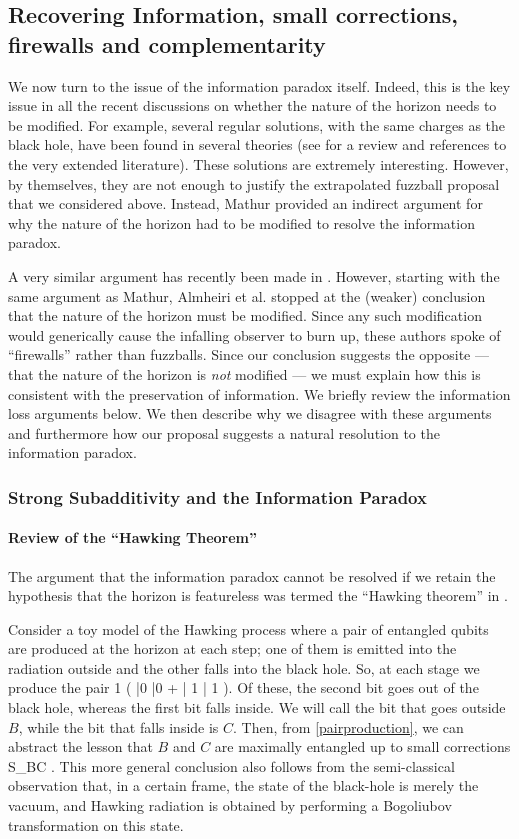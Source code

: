 \subsection{Recovering Information, small corrections, firewalls and complementarity}
We now turn to the issue of the information paradox itself. Indeed, this is the key issue in all the recent discussions on whether the nature of the horizon needs to be modified. For example, several regular solutions, with the same charges as the black hole, have been found in several theories (see \cite{Skenderis:2008qn} for a review and references to the very extended literature). These solutions are extremely interesting. However, by themselves, they are not enough to justify the extrapolated fuzzball proposal that we considered above. Instead, Mathur \cite{Mathur:2009hf} provided an indirect argument for why the nature of the horizon had to be 
modified to resolve the information paradox. 

A very similar argument has recently been made in \cite{Almheiri:2012rt}. However, starting with the same argument as Mathur,  Almheiri et al. stopped at  the (weaker) conclusion that the nature of the horizon must be modified. Since any such modification would generically cause the infalling observer to burn up, these authors spoke of ``firewalls'' rather than fuzzballs. 
 Since our conclusion suggests the opposite --- that the nature of the horizon is {\em not} modified --- we must explain how this is consistent with 
the preservation of information. We briefly review the information loss arguments below. We then describe why we disagree with these arguments and furthermore how our proposal suggests a natural resolution to the information paradox.  
\subsubsection{Strong Subadditivity and the Information Paradox}
\paragraph{Review of the ``Hawking Theorem''}
The argument that the information paradox cannot be resolved if we retain
the hypothesis that the horizon is featureless was termed the ``Hawking theorem'' in \cite{Mathur:2009hf}. 

Consider a toy model of the Hawking process where a pair of entangled qubits are produced at the horizon at each step; one of them is emitted into the radiation outside and the other falls into the black hole. So, at each 
stage we produce the pair
\be
\label{pairproduction}
{1 \over {}} \left( |0 \rangle |0 \rangle + | 1 \rangle | 1 \rangle \right).
\ee
Of these, the second bit goes out of the black hole, whereas the first bit falls inside. We will call the bit that goes outside $B$, while the bit that falls inside is $C$. Then, from \eqref{pairproduction}, we can abstract the lesson that $B$ and $C$ are maximally entangled up to small corrections
\be
\label{bcpure}
S_{BC} .
\ee
This more general conclusion also follows from the semi-classical 
observation that, in a certain frame, the state of the black-hole is merely the vacuum, and Hawking radiation is obtained by performing a Bogoliubov transformation on this state. 

